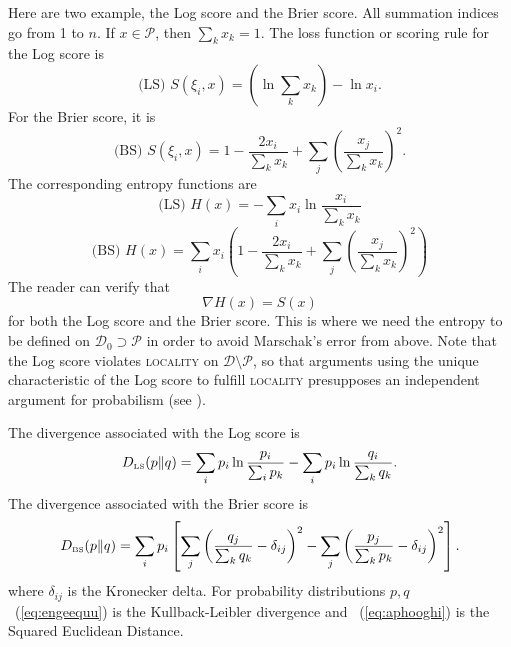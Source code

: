 \documentclass[12pt]{article}
\begin{document}
Here are two example, the Log score and the Brier score. All summation
indices go from 1 to $n$. If $x\in\mathcal{P}$, then
$\sum_{k}x_{k}=1$. The loss function or scoring rule for the Log score
is
\begin{equation}
  \label{eq:oneeraiw}
  \mbox{(LS) }S(\xi_{i},x)=\left(\ln\sum_{k}x_{k}\right)-\ln{}x_{i}.
\end{equation}
For the Brier score, it is
\begin{equation}
  \label{eq:hiexaeji}
  \mbox{(BS) }S(\xi_{i},x)=1-\frac{2x_{i}}{\sum_{k}x_{k}}+\sum_{j}\left(\frac{x_{j}}{\sum_{k}x_{k}}\right)^{2}.
\end{equation}
The corresponding entropy functions are
\begin{equation}
  \label{eq:yeuthohn}
  \mbox{(LS) }H(x)=-\sum_{i}{}x_{i}\ln\frac{x_{i}}{\sum_{k}x_{k}}
\end{equation}
\begin{equation}
  \label{eq:ahfooyai}
  \mbox{(BS) }H(x)=\sum_{i}{}x_{i}\left(1-\frac{2x_{i}}{\sum_{k}x_{k}}+\sum_{j}\left(\frac{x_{j}}{\sum_{k}x_{k}}\right)^2\right)
\end{equation}
The reader can verify that
\begin{equation}
  \label{eq:eikughoh}
  \nabla{}H(x)=S(x)
\end{equation}
for both the Log score and the Brier score. This is where we need the
entropy to be defined on $\mathcal{D_{0}}\supset\mathcal{P}$ in order to
avoid Marschak's error from above. Note that the Log score violates
\textsc{locality} on $\mathcal{D}\setminus\mathcal{P}$, so that
arguments using the unique characteristic of the Log score to fulfill
\textsc{locality} presupposes an independent argument for probabilism
(see ).

The divergence associated with the Log score is
\begin{equation}
  \label{eq:engeequu}
  D_{\mbox{\tiny LS}}(p\|q)=\sum_{i}p_{i}\ln\frac{p_{i}}{\sum_{i}p_{k}}-\sum_{i}p_{i}\ln\frac{q_{i}}{\sum_{k}q_{k}}.
\end{equation}
The divergence associated with the Brier score is
\begin{equation}
  \label{eq:aphooghi}
  D_{\mbox{\tiny BS}}(p\|q)=\sum_{i}p_{i}\left[\sum_{j}\left(\frac{q_{j}}{\sum_{k}q_{k}}-\delta_{ij}\right)^{2}-\sum_{j}\left(\frac{p_{j}}{\sum_{k}p_{k}}-\delta_{ij}\right)^{2}\right].
\end{equation}
where $\delta_{ij}$ is the Kronecker delta. For probability
distributions $p,q$ {\quation}~(\ref{eq:engeequu}) is the
Kullback-Leibler divergence and {\quation}~(\ref{eq:aphooghi}) is the
Squared Euclidean Distance.
\end{document}
